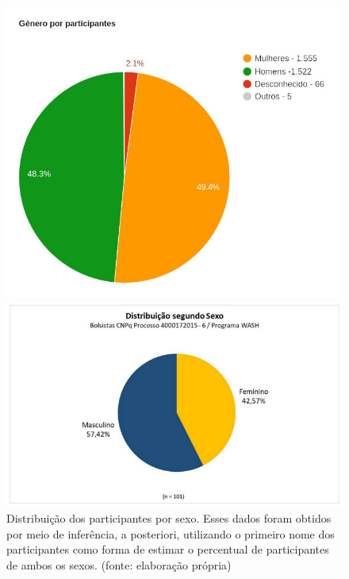 \documentclass[
12pt,		%
openright,	%
twoside,  %
a4paper,			%
chapter=TITLE,		%
english,			%
french,				%
spanish,			%
brazil				%
]{USPSC-classe/USPSC}
\begin{document}
\captionsetup{format=plain}
\begin{figure}[max size={\textwidth}{\textheight}]

\centering


\begin{minipage}[b]{0.4\linewidth}
        \centering
                \includegraphics[width=1.0\linewidth]{../../imagens/genero-todos-crop.jpeg}
                \caption{Distribui\c{c}\~ao dos participantes por sexo. Esses dados foram obtidos por meio de infer\^encia, a posteriori, utilizando o primeiro nome dos participantes como forma de estimar o percentual de participantes de ambos os sexos. (fonte: elabora\c{c}\~ao pr\'opria)}
                \label{ef11d820efb73d78fb64eb6bdd03853471a8e89f}
\end{minipage}%
\hspace{0.5cm}
\begin{minipage}[b]{0.4\linewidth}
        \centering
                \includegraphics[width=1.0\linewidth]{../../imagens/distribuicao-sexo-bolsistas.png}

\end{minipage}
\end{figure}
\end{document}
